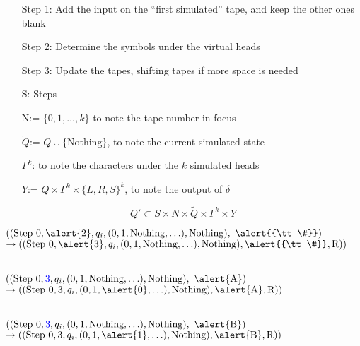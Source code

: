 \documentclass[
  ignorenonframetext,
]{beamer}
\begin{document}
\begin{frame}
\begin{enumerate}
\item[Step 1:] Add the input on the ``first simulated'' tape, and keep the other ones blank\pause
\item[Step 2:] Determine the symbols under the virtual heads\pause
\item[Step 3:] Update the tapes, shifting tapes if more space is needed\pause
\end{enumerate}
\end{frame}

\begin{frame}
\begin{enumerate}
\item[S:] Steps\pause
\item[N:=] $\{0,1,\ldots,k\}$ to note the tape number in focus\pause
\item[$\tilde{Q}$:=] $Q\cup \{\text{Nothing}\}$, to note the current simulated state\pause
\item[$\Gamma^k$:] to note the characters under the $k$ simulated heads\pause
\item[$Y$:=] $Q \times \Gamma^k \times \{L, R, S\}^k$, to note the output of $\delta$\pause
\end{enumerate}

$$Q'\subset S \times N \times \tilde{Q}\times \Gamma^k \times Y$$
\end{frame}

\begin{frame}
$((\text{Step 0}, \alert{2}, q_i, (0,1, \text{Nothing}, \ldots), \text{Nothing}),\  \alert{{\tt \#}})$\\ $\to ((\text{Step 0}, \alert{3}, q_i, (0, 1, \text{Nothing}, \ldots), \text{Nothing}), \alert{{\tt \#}}, \text{R}))$\\~\\\pause

$((\text{Step 0}, {\color{blue}3}, q_i, (0,1, \text{Nothing}, \ldots), \text{Nothing}),\  \alert{\text{A}})$\\ $\to ((\text{Step 0}, 3, q_i, (0, 1, \alert{0}, \ldots), \text{Nothing}), \alert{\text{A}}, \text{R}))$\\~\\\pause

$((\text{Step 0}, {\color{blue}3}, q_i, (0,1, \text{Nothing}, \ldots), \text{Nothing}),\  \alert{\text{B}})$\\ $\to ((\text{Step 0}, 3, q_i, (0, 1, \alert{1}, \ldots), \text{Nothing}), \alert{\text{B}}, \text{R}))$

\end{frame}
\end{document}
